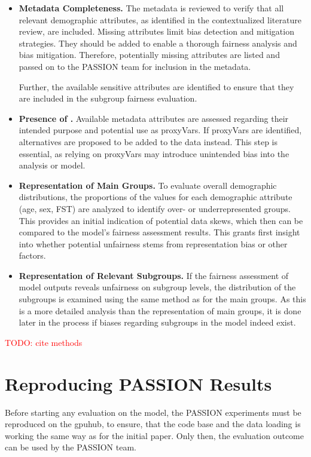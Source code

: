 \documentclass[12pt, a4paper, oneside]{book}   	%
\renewcommand{\todo}[1]{\textcolor{red}{TODO: #1}}
\begin{document}
		\begin{itemize}
			\item \textbf{Metadata Completeness.} The metadata is reviewed to verify that all relevant demographic attributes, as identified in the contextualized literature review, are included. Missing attributes limit bias detection and mitigation strategies. They should be added to enable a thorough fairness analysis and bias mitigation. Therefore, potentially missing attributes are listed and passed on to the PASSION team for inclusion in the metadata.
			
			Further, the available sensitive attributes are identified to ensure that they are included in the subgroup fairness evaluation.
			
			\item \textbf{Presence of .} Available metadata attributes are assessed regarding their intended purpose and potential use as \glspl{proxyVar}. If \glspl{proxyVar} are identified, alternatives are proposed to be added to the data instead. This step is essential, as relying on \glspl{proxyVar} may introduce unintended bias into the analysis or model.
			
			\item \textbf{Representation of Main Groups.} To evaluate overall demographic distributions, the proportions of the values for each demographic attribute (age, sex, \gls{FST}) are analyzed to identify over- or underrepresented groups. This provides an initial indication of potential data skews, which then can be compared to the model's fairness assessment results. This grants first insight into whether potential unfairness stems from representation bias or other factors.
			
			\item \textbf{Representation of Relevant Subgroups.}
			If the fairness assessment of model outputs reveals unfairness on subgroup levels, the distribution of the subgroups is examined using the same method as for the main groups. As this is a more detailed analysis than the representation of main groups, it is done later in the process if biases regarding subgroups in the model indeed exist.
		\end{itemize}
		\todo{cite methods}
		
		\section{Reproducing PASSION Results}
		Before starting any evaluation on the model, the PASSION experiments must be reproduced on the \gls{gpuhub}, to ensure, that the code base and the data loading is working the same way as for the initial paper. Only then, the evaluation outcome can be used by the PASSION team.
		
\end{document}
